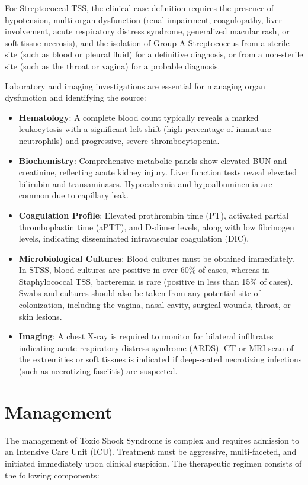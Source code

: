 For Streptococcal TSS, the clinical case definition requires the presence of hypotension, multi-organ dysfunction (renal impairment, coagulopathy, liver involvement, acute respiratory distress syndrome, generalized macular rash, or soft-tissue necrosis), and the isolation of Group A Streptococcus from a sterile site (such as blood or pleural fluid) for a definitive diagnosis, or from a non-sterile site (such as the throat or vagina) for a probable diagnosis.

Laboratory and imaging investigations are essential for managing organ dysfunction and identifying the source:
\begin{itemize}
    \item \textbf{Hematology}: A complete blood count typically reveals a marked leukocytosis with a significant left shift (high percentage of immature neutrophils) and progressive, severe thrombocytopenia.
    \item \textbf{Biochemistry}: Comprehensive metabolic panels show elevated BUN and creatinine, reflecting acute kidney injury. Liver function tests reveal elevated bilirubin and transaminases. Hypocalcemia and hypoalbuminemia are common due to capillary leak.
    \item \textbf{Coagulation Profile}: Elevated prothrombin time (PT), activated partial thromboplastin time (aPTT), and D-dimer levels, along with low fibrinogen levels, indicating disseminated intravascular coagulation (DIC).
    \item \textbf{Microbiological Cultures}: Blood cultures must be obtained immediately. In STSS, blood cultures are positive in over 60\% of cases, whereas in Staphylococcal TSS, bacteremia is rare (positive in less than 15\% of cases). Swabs and cultures should also be taken from any potential site of colonization, including the vagina, nasal cavity, surgical wounds, throat, or skin lesions.
    \item \textbf{Imaging}: A chest X-ray is required to monitor for bilateral infiltrates indicating acute respiratory distress syndrome (ARDS). CT or MRI scan of the extremities or soft tissues is indicated if deep-seated necrotizing infections (such as necrotizing fasciitis) are suspected.
\end{itemize}

\section*{Management}
The management of Toxic Shock Syndrome is complex and requires admission to an Intensive Care Unit (ICU). Treatment must be aggressive, multi-faceted, and initiated immediately upon clinical suspicion. The therapeutic regimen consists of the following components:

